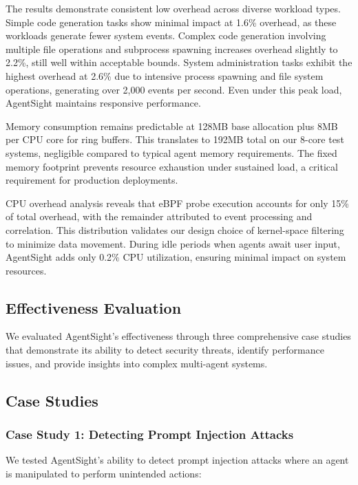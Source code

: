 The results demonstrate consistent low overhead across diverse workload types. Simple code generation tasks show minimal impact at 1.6\% overhead, as these workloads generate fewer system events. Complex code generation involving multiple file operations and subprocess spawning increases overhead slightly to 2.2\%, still well within acceptable bounds. System administration tasks exhibit the highest overhead at 2.6\% due to intensive process spawning and file system operations, generating over 2,000 events per second. Even under this peak load, AgentSight maintains responsive performance.

Memory consumption remains predictable at 128MB base allocation plus 8MB per CPU core for ring buffers. This translates to 192MB total on our 8-core test systems, negligible compared to typical agent memory requirements. The fixed memory footprint prevents resource exhaustion under sustained load, a critical requirement for production deployments.

CPU overhead analysis reveals that eBPF probe execution accounts for only 15\% of total overhead, with the remainder attributed to event processing and correlation. This distribution validates our design choice of kernel-space filtering to minimize data movement. During idle periods when agents await user input, AgentSight adds only 0.2\% CPU utilization, ensuring minimal impact on system resources.

\subsection{Effectiveness Evaluation}

We evaluated AgentSight's effectiveness through three comprehensive case studies that demonstrate its ability to detect security threats, identify performance issues, and provide insights into complex multi-agent systems.

\subsection{Case Studies}

\subsubsection{Case Study 1: Detecting Prompt Injection Attacks}

We tested AgentSight's ability to detect prompt injection attacks where an agent is manipulated to perform unintended actions:

